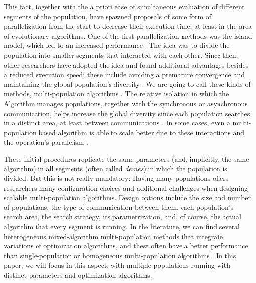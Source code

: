 \documentclass[runningheads]{llncs}
\begin{document}
This fact, together with the a priori ease of simultaneous evaluation
of different segments of the population, have spawned proposals of
some form of parallelization from the start
\cite{muhlenbein1988evolution} to decrease their execution time, at
least in the area of evolutionary algorithms. One of the first
parallelization methods was the island model, which led to an
increased performance
\cite{gorges1990explicit,grosso1985computer}. The idea was to divide
the population into smaller segments that interacted with each
other. Since then, other researchers have adopted the idea and found
additional advantages besides a reduced execution speed; these include
avoiding a premature convergence and maintaining the global
population's diversity \cite{li2015multi}. We are going to call these
kinds of methods, multi-population algorithms \cite{Ma2019}. The
relative isolation in which the Algorithm manages populations,
together with the synchronous or asynchronous communication, helps
increase the global diversity since each population searches in a
distinct area, at least between communications
\cite{li2016multi,wu2016differential}. In some cases, even a
multi-population based algorithm is able to scale better due to these
interactions and the operation's parallelism \cite{ALBA20027}.

These initial procedures replicate the same parameters (and,
implicitly, the same algorithm) in all
segments (often called {\em demes}) in which the population is
divided. But this is not really mandatory: Having many populations
offers researchers many configuration choices and additional
challenges when designing scalable multi-population algorithms.
Design options include the size and number of populations, the type of
communication between them, each population's search area, the search
strategy, its parametrization, and, of course, the actual algorithm
that every segment is running. In the literature, we can find several
heterogeneous mixed-algorithm multi-population methods that integrate
variations of optimization algorithms, and these often have a better performance
than single-population or homogeneous multi-population algorithms 
\cite{wu2016differential,nseef2016adaptive}. In this paper,
we will focus in this aspect, with multiple populations running with
distinct parameters and optimization algorithms.
\end{document}
